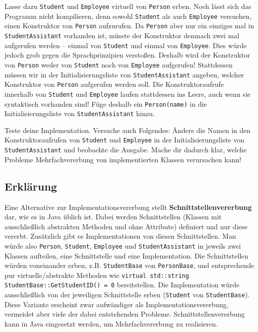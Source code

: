 Lasse dazu \lstinline{Student} und \lstinline{Employee} virtuell von \lstinline{Person} erben.
Noch lässt sich das Programm nicht kompilieren, denn sowohl \lstinline{Student} als auch \lstinline{Employee} versuchen, einen Konstruktor von \lstinline{Person} aufzurufen.
Da \lstinline{Person} aber nur ein einziges mal in \lstinline{StudentAssistant} vorhanden ist, müsste der Konstruktor demnach zwei mal aufgerufen werden -- einmal von \lstinline{Student} und einmal von \lstinline{Employee}.
Dies würde jedoch grob gegen die Sprachprinzipien verstoßen.
Deshalb wird der Konstruktor von \lstinline{Person} weder von \lstinline{Student} noch von \lstinline{Employee} aufgerufen!
Stattdessen müssen wir in der Initialisierungsliste von \lstinline{StudentAssistant} angeben, welcher Konstruktor von \lstinline{Person} aufgerufen werden soll.
Die Konstruktoraufrufe innerhalb von \lstinline{Student} und \lstinline{Employee} laufen stattdessen ins Leere, auch wenn sie syntaktisch vorhanden sind! Füge deshalb ein \lstinline{Person(name)} in die Initialisierungsliste von \lstinline{StudentAssistant} hinzu.

Teste deine Implementation.
Versuche auch Folgendes: Ändere die Namen in den Konstruktoraufrufen von \lstinline{Student} und \lstinline{Employee} in der Initialisierungsliste von \lstinline{StudentAssistant} und beobachte die Ausgabe.
Mache dir dadurch klar, welche Probleme Mehrfachvererbung von implementierten Klassen verursachen kann!

\subsection{Erklärung}

Eine Alternative zur Implementationsvererbung stellt \textbf{Schnittstellenvererbung} dar, wie es in Java üblich ist. Dabei werden Schnittstellen (Klassen mit ausschließlich abstrakten Methoden und ohne Attribute) definiert und nur diese vererbt.
Zusätzlich gibt es Implementationen von diesen Schnittstellen.
Man würde also \lstinline{Person}, \lstinline{Student}, \lstinline{Employee} und \lstinline{StudentAssistant} in jeweils zwei Klassen aufteilen, eine Schnittstelle und eine Implementation.
Die Schnittstellen würden voneinander erben, z.B. \lstinline{StudentBase} von \lstinline{PersonBase}, und entsprechende pur virtuelle/abstrakte Methoden wie \lstinline{virtual std::string StudentBase::GetStudentID() = 0} bereitstellen.
Die Implementation würde ausschließlich von der jeweiligen Schnittstelle erben (\lstinline{Student} von \lstinline{StudentBase}).
Diese Variante erscheint zwar aufwändiger als Implementationsvererbung, vermeidet aber viele der dabei entstehenden Probleme.
Schnittstellenvererbung kann in Java eingesetzt werden, um Mehrfachvererbung zu realisieren.
